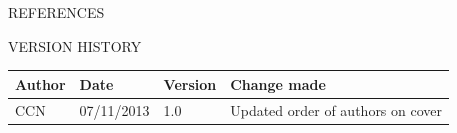 \documentclass{article}
\newcommand{\versionhistory}{
		\begin{tabularx}{\linewidth}{| p{2cm} | p{2cm} | p{2cm} | X | }
			\hline
			\bf{Author} & \bf{Date} & \bf{Version} & \bf{Change made} \\
			\hline
			CCN & 07/11/2013 & 1.0 & Updated order of authors on cover \\
			\hline
		\end{tabularx}
}
\begin{document}
	\nocite{LaTeXTemplate} %

	\newpage
	\begin{section}{REFERENCES}
		
		
	\end{section}
	
	\vspace{1cm}
	\begin{section}{VERSION HISTORY}
		\versionhistory
	\end{section}
\end{document}
